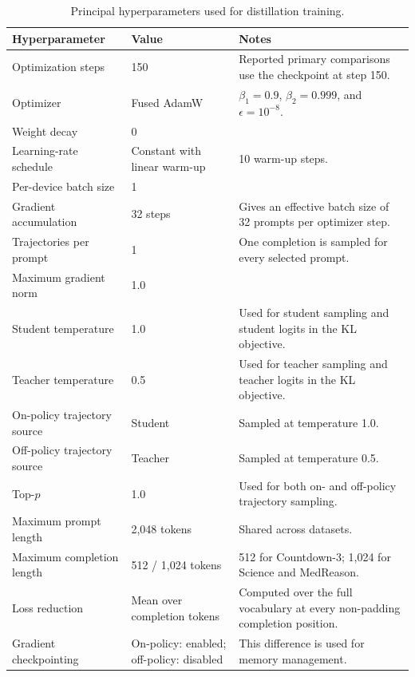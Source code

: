 \documentclass{article} %
\theoremstyle{plain}
\theoremstyle{definition}
\theoremstyle{remark}
\begin{document}
\begin{table}[t]
\centering
\small
\setlength{\tabcolsep}{5pt}
\renewcommand{\arraystretch}{1.12}
\begin{tabularx}{\textwidth}{p{}p{}X}
\toprule
Hyperparameter & Value & Notes \\
\midrule

Optimization steps
& 150
& Reported primary comparisons use the checkpoint at step 150. \\

Optimizer
& Fused AdamW
& $\beta_1=0.9$, $\beta_2=0.999$, and $\epsilon=10^{-8}$. \\

Weight decay
& 0
&  \\

Learning-rate schedule
& Constant with linear warm-up
& 10 warm-up steps. \\

Per-device batch size
& 1
&  \\

Gradient accumulation
& 32 steps
& Gives an effective batch size of 32 prompts per optimizer step. \\

Trajectories per prompt
& 1
& One completion is sampled for every selected prompt. \\

Maximum gradient norm
& 1.0
&  \\

Student temperature
& 1.0
& Used for student sampling and student logits in the KL objective. \\

Teacher temperature
& 0.5
& Used for teacher sampling and teacher logits in the KL objective. \\

On-policy trajectory source
& Student
& Sampled at temperature 1.0. \\

Off-policy trajectory source
& Teacher
& Sampled at temperature 0.5. \\

Top-$p$
& 1.0
& Used for both on- and off-policy trajectory sampling. \\

Maximum prompt length
& 2,048 tokens
& Shared across datasets. \\

Maximum completion length
& 512 / 1,024 tokens
& 512 for Countdown-3; 1,024 for Science and MedReason. \\

Loss reduction
& Mean over completion tokens
& Computed over the full vocabulary at every non-padding completion position. \\

Gradient checkpointing
& On-policy: enabled; off-policy: disabled
& This difference is used for memory management. \\

\bottomrule
\end{tabularx}
\caption{Principal hyperparameters used for distillation training.}
\label{tab:student-training-hyperparameters}
\end{table}
\end{document}
